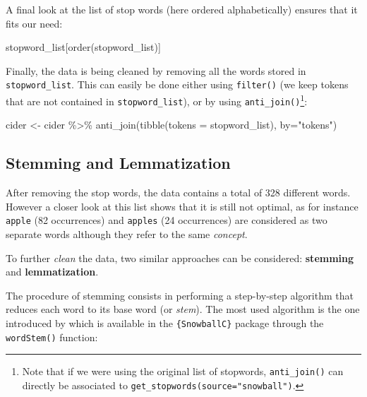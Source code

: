 \documentclass[
]{krantz}
\makeatletter
\newenvironment{Shaded}{\begin{snugshade}}{\end{snugshade}}
\newcommand{\AttributeTok}[1]{\textcolor[rgb]{0.61,0.61,0.61}{#1}}
\newcommand{\FunctionTok}[1]{\textcolor[rgb]{0,0,0}{#1}}
\newcommand{\NormalTok}[1]{#1}
\newcommand{\OtherTok}[1]{\textcolor[rgb]{0.37,0.37,0.37}{#1}}
\newcommand{\SpecialCharTok}[1]{\textcolor[rgb]{0,0,0}{#1}}
\newcommand{\StringTok}[1]{\textcolor[rgb]{0.5,0.5,0.5}{#1}}
\newenvironment{kframe}{%
\medskip{}
\setlength{\fboxsep}{.8em}
 \def\at@end@of@kframe{}%
 \ifinner\ifhmode%
  \def\at@end@of@kframe{\end{minipage}}%
  \begin{minipage}{\columnwidth}%
 \fi\fi%
 \def\FrameCommand##1{\hskip\@totalleftmargin \hskip-\fboxsep
 \colorbox{shadecolor}{##1}\hskip-\fboxsep
     \hskip-\linewidth \hskip-\@totalleftmargin \hskip\columnwidth}%
 \MakeFramed {\advance\hsize-\width
   \@totalleftmargin\z@ \linewidth\hsize
   \@setminipage}}%
 {\par\unskip\endMakeFramed%
 \at@end@of@kframe}
\renewenvironment{Shaded}{\begin{kframe}}{\end{kframe}}
\makeatother
\begin{document}
A final look at the list of stop words (here ordered alphabetically) ensures that it fits our need:

\begin{Shaded}
\begin{Highlighting}[]
\NormalTok{stopword\_list[}\FunctionTok{order}\NormalTok{(stopword\_list)]}
\end{Highlighting}
\end{Shaded}

Finally, the data is being cleaned by removing all the words stored in \texttt{stopword\_list}. This can easily be done either using \texttt{filter()} (we keep tokens that are not contained in \texttt{stopword\_list}), or by using \texttt{anti\_join()}\footnote{Note that if we were using the original list of stopwords, \texttt{anti\_join()} can directly be associated to \texttt{get\_stopwords(source="snowball")}.}:

\begin{Shaded}
\begin{Highlighting}[]
\NormalTok{cider }\OtherTok{\textless{}{-}}\NormalTok{ cider }\SpecialCharTok{\%\textgreater{}\%} 
  \FunctionTok{anti\_join}\NormalTok{(}\FunctionTok{tibble}\NormalTok{(}\AttributeTok{tokens =}\NormalTok{ stopword\_list), }\AttributeTok{by=}\StringTok{"tokens"}\NormalTok{)}
\end{Highlighting}
\end{Shaded}

\hypertarget{stemming-and-lemmatization}{%
\subsection{Stemming and Lemmatization}\label{stemming-and-lemmatization}}

After removing the stop words, the data contains a total of 328 different words. However a closer look at this list shows that it is still not optimal, as for instance \texttt{apple} (82 occurrences) and \texttt{apples} (24 occurrences) are considered as two separate words although they refer to the same \emph{concept}.

To further \emph{clean} the data, two similar approaches can be considered: \textbf{stemming} and \textbf{lemmatization}.

The procedure of stemming consists in performing a step-by-step algorithm that reduces each word to its base word (or \emph{stem}). The most used algorithm is the one introduced by \citet{Porter1980} which is available in the \texttt{\{SnowballC\}} package through the \texttt{wordStem()} function:
\end{document}
